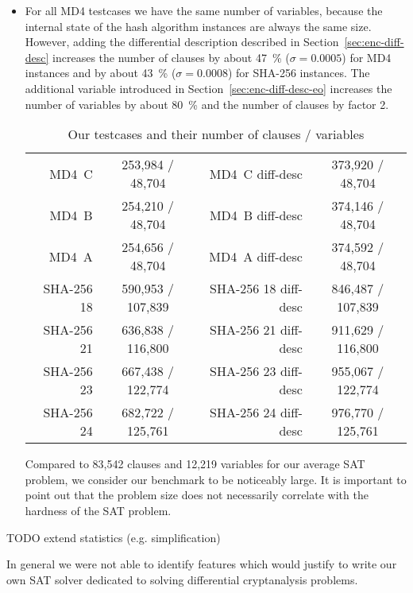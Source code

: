 \begin{itemize}
  \item For all MD4 testcases we have the same number of variables,
    because the internal state of the hash algorithm instances are
    always the same size.
    However, adding the differential description described in
    Section~\ref{sec:enc-diff-desc} increases the number of clauses
    by about 47~\% ($\sigma = 0.0005$) for MD4 instances and
    by about 43~\% ($\sigma = 0.0008$) for SHA-256 instances.
    The additional variable introduced in Section~\ref{sec:enc-diff-desc-eo}
    increases the number of variables by about 80~\%
    and the number of clauses by factor 2.

    \begin{table}[!h]
      \begin{center}
        \begin{tabular}{rc|rc}
          MD4~C & 253,984 / 48,704 & MD4~C diff-desc & 373,920 / 48,704 \\
          MD4~B & 254,210 / 48,704 & MD4~B diff-desc & 374,146 / 48,704 \\
          MD4~A & 254,656 / 48,704 & MD4~A diff-desc & 374,592 / 48,704 \\
          SHA-256 18 & 590,953 / 107,839 & SHA-256 18 diff-desc & 846,487 / 107,839 \\
          SHA-256 21 & 636,838 / 116,800 & SHA-256 21 diff-desc & 911,629 / 116,800 \\
          SHA-256 23 & 667,438 / 122,774 & SHA-256 23 diff-desc & 955,067 / 122,774 \\
          SHA-256 24 & 682,722 / 125,761 & SHA-256 24 diff-desc & 976,770 / 125,761
        \end{tabular}
        \caption{Our testcases and their number of clauses / variables}
      \end{center}
    \end{table}

    Compared to 83,542 clauses and 12,219 variables for our average SAT problem,
    we consider our benchmark to be noticeably large. It is important to
    point out that the problem size does not necessarily correlate with
    the hardness of the SAT problem.
\end{itemize}

TODO extend statistics (e.g. simplification)

In general we were not able to identify features which would justify to
write our own SAT solver dedicated to solving differential cryptanalysis problems.

